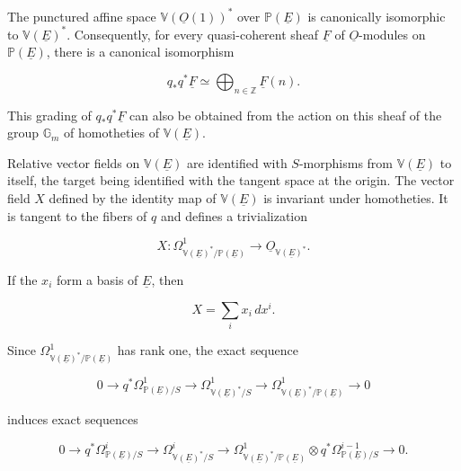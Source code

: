 The punctured affine space $\mathbb V(\underline O(1))^*$ over
$\mathbb P(\underline E)$ is canonically isomorphic to
$\mathbb V(\underline E)^*$.  Consequently, for every quasi-coherent sheaf
$\underline F$ of $\underline O$-modules on $\mathbb P(\underline E)$, there
is a canonical isomorphism


\begin{equation}\tag{1.1.1}
q_*q^*\underline F\simeq
\bigoplus_{n\in\mathbb Z}\underline F(n).
\end{equation}

This grading of $q_*q^*\underline F$ can also be obtained from the action on
this sheaf of the group $\mathbb G_m$ of homotheties of
$\mathbb V(\underline E)$.

Relative vector fields on $\mathbb V(\underline E)$ are identified with
$S$-morphisms from $\mathbb V(\underline E)$ to itself, the target being
identified with the tangent space at the origin.  The vector field $X$ defined
by the identity map of $\mathbb V(\underline E)$ is invariant under
homotheties.  It is tangent to the fibers of $q$ and defines a trivialization

\begin{equation}\tag{1.1.2}
X:\Omega^1_{\mathbb V(\underline E)^*/\mathbb P(\underline E)}
\longrightarrow\underline O_{\mathbb V(\underline E)^*}.
\end{equation}

If the $x_i$ form a basis of $\underline E$, then

\begin{equation*}
X=\sum_i x_i\,dx^i.
\end{equation*}

Since $\Omega^1_{\mathbb V(\underline E)^*/\mathbb P(\underline E)}$ has
rank one, the exact sequence

\begin{equation*}
0\longrightarrow q^*\Omega^1_{\mathbb P(\underline E)/S}
\longrightarrow\Omega^1_{\mathbb V(\underline E)^*/S}
\longrightarrow
\Omega^1_{\mathbb V(\underline E)^*/\mathbb P(\underline E)}
\longrightarrow0
\end{equation*}

induces exact sequences

\begin{equation*}
0\longrightarrow q^*\Omega^i_{\mathbb P(\underline E)/S}
\longrightarrow\Omega^i_{\mathbb V(\underline E)^*/S}
\longrightarrow
\Omega^1_{\mathbb V(\underline E)^*/\mathbb P(\underline E)}
\otimes q^*\Omega^{i-1}_{\mathbb P(\underline E)/S}
\longrightarrow0.
\end{equation*}

